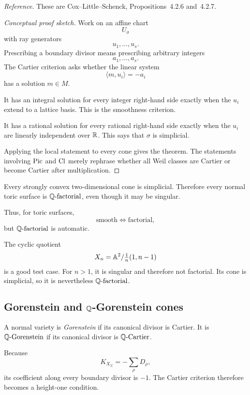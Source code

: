 \noindent
\textit{Reference.}
These are Cox--Little--Schenck, Propositions~4.2.6 and~4.2.7.

\begin{proof}[Conceptual proof sketch]
Work on an affine chart
\[
U_\sigma
\]
with ray generators
\[
u_1,\ldots,u_s.
\]
Prescribing a boundary divisor means prescribing arbitrary integers
\[
a_1,\ldots,a_s.
\]
The Cartier criterion asks whether the linear system
\[
\langle m,u_i\rangle=-a_i
\]
has a solution \(m\in M\).

It has an integral solution for every integer right-hand side exactly
when the \(u_i\) extend to a lattice basis. This is the smoothness
criterion.

It has a rational solution for every rational right-hand side exactly
when the \(u_i\) are linearly independent over \(\mathbb{R}\). This says that
\(\sigma\) is simplicial.

Applying the local statement to every cone gives the theorem. The
statements involving \(\operatorname{Pic}\) and
\(\operatorname{Cl}\) merely rephrase whether all Weil classes are
Cartier or become Cartier after multiplication.
\end{proof}

\begin{observation}
Every strongly convex two-dimensional cone is simplicial. Therefore
every normal toric surface is \(\mathbb{Q}\text{-factorial}\), even though it may be
singular.

Thus, for toric surfaces,
\[
\text{smooth}
\Longleftrightarrow
\text{factorial},
\]
but \(\mathbb{Q}\text{-factorial}\) is automatic.
\end{observation}

The cyclic quotient
\[
X_n=\mathbb{A}^2/\tfrac1n(1,n-1)
\]
is a good test case. For \(n>1\), it is singular and therefore not
factorial. Its cone is simplicial, so it is nevertheless
\(\mathbb{Q}\text{-factorial}\).

\subsection{Gorenstein and \texorpdfstring{\(\mathbb{Q}\)}{Q}-Gorenstein cones}

\begin{definition}
A normal variety is \emph{Gorenstein} if its canonical divisor is
Cartier. It is \emph{\(\mathbb{Q}\text{-Gorenstein}\)} if its canonical divisor is
\(\mathbb{Q}\text{-Cartier}\).
\end{definition}

Because
\[
K_{X_\Sigma}
=
-\sum_\rho D_\rho,
\]
its coefficient along every boundary divisor is \(-1\). The Cartier
criterion therefore becomes a height-one condition.

